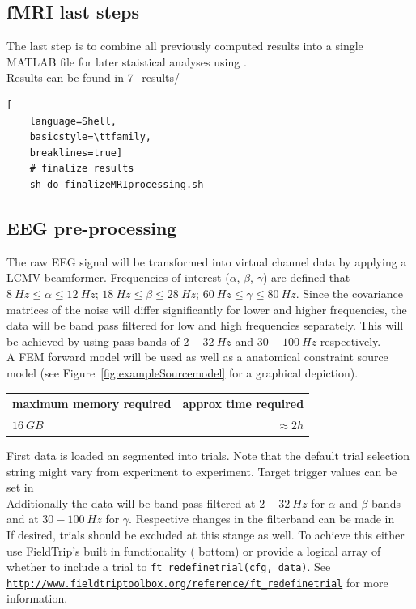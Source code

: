 \documentclass[12pt,a4paper]{scrartcl}
\begin{document}
\subsection{fMRI last steps}
The last step is to combine all previously computed results into a single MATLAB file for later staistical analyses using \texttt{}.\\

\noindent Results can be found in 7\_results/\\
\begin{lstlisting}[
    language=Shell,
    basicstyle=\ttfamily,
    breaklines=true]
    # finalize results
    sh do_finalizeMRIprocessing.sh
\end{lstlisting}


\subsection{EEG pre-processing}
The raw EEG signal will be transformed into virtual channel data by applying a LCMV beamformer. Frequencies of interest ($\alpha$, $\beta$, $\gamma$) are defined that $8~Hz \leq \alpha \leq 12~Hz$; $18~Hz \leq \beta \leq 28~Hz$; $60~Hz \leq \gamma \leq 80~Hz$. Since the covariance matrices of the noise will differ significantly for lower and higher frequencies, the data will be band pass filtered for low and high frequencies separately. This will be achieved by using pass bands of $2-32~Hz$ and $30-100~Hz$ respectively.\\
A FEM forward model will be used as well as a anatomical constraint source model (see Figure~\ref{fig:exampleSourcemodel} for a graphical depiction).\\
\begin{table}[h]
\begin{tabular}{l | r}
\toprule
maximum memory required & approx time required\\\toprule
$16~GB$ & $\approx 2h$ \\\bottomrule
\end{tabular}
\end{table}
First data is loaded an segmented into trials. Note that the default trial selection string might vary from experiment to experiment. Target trigger values can be set in \texttt{}\\
Additionally the data will be band pass filtered at $2-32~Hz$ for $\alpha$ and $\beta$ bands and at $30-100~Hz$ for $\gamma$. Respective changes in the filterband can be made in \texttt{}\\
If desired, trials should be excluded at this stange as well. To achieve this either use FieldTrip's built in functionality (\texttt{} bottom) or provide a logical array of whether to include a trial to \texttt{ft\_redefinetrial(cfg, data)}. See \href{http://www.fieldtriptoolbox.org/reference/ft_redefinetrial}{\nolinkurl{http://www.fieldtriptoolbox.org/reference/ft\_redefinetrial}} for more information.\\
\end{document}
